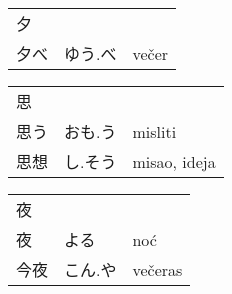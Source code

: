 

\newenvironment{dictentry}[1]{
	\begin{tabular}{p{2cm} p{3cm} p{10cm}}
		#1 &&\\
}{
	\end{tabular}
	\vspace{20pt}
}

\newcommand{\example}[3]{
	\hspace*{\fill}#1 & #2 & #3\\
}

\author{ロボット君}


\begin{dictentry}{夕}
\example{夕べ}{ゆう.べ}{večer}
\end{dictentry}

\begin{dictentry}{思}
\example{思う}{おも.う}{misliti}
\example{思想}{し.そう}{misao, ideja}
\end{dictentry}

\begin{dictentry}{夜}
\example{夜}{よる}{noć}
\example{今夜}{こん.や}{večeras}
\end{dictentry}


